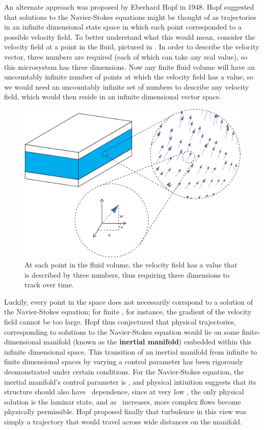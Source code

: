 An alternate approach was proposed by Eberhard Hopf in 1948. Hopf suggested that solutions to the Navier-Stokes equations might be thought of as trajectories in an infinite dimensional state space in which each point corresponded to a possible velocity field. To better understand what this would mean, consider the velocity field at a point in the fluid, pictured in . In order to describe the velocity vector, three numbers are required (each of which can take any real value), so this microsystem has three dimensions. Now any finite fluid volume will have an uncountably infinite number of points at which the velocity field has a value, so we would need an uncountably infinite set of numbers to describe any velocity field, which would then reside in an infinite dimensional vector space.
\begin{figure}
\centerline{
\includegraphics[scale=0.6]{Figs/VectorSpace}}
\caption{At each point in the fluid volume, the velocity field has a value that is described by three numbers, thus requiring three dimensions to track over time.}\label{fig:VectorSpace}
\end{figure}
Luckily, every point in the space does not necessarily corrspond to a solution of the Navier-Stokes equation; for finite \ReN, for instance, the gradient of the velocity field cannot be too large. Hopf thus conjectured that physical trajectories, corresponding to solutions to the Navier-Stokes equation would lie on some finite-dimensional manifold (known as the {\bf inertial manifold}) embedded within this infinite dimensional space. This transition of an inertial manifold from infinite to finite dimensional spaces by varying a control parameter has been rigorously deomonstrated under certain conditions. For the Navier-Stokes equation, the inertial manifold's control parameter is \ReN, and physical intiuition suggests that its structure should also have \ReN~dependence, since at very low \ReN, the only physical solution is the laminar state, and as \ReN~increases, more complex flows become physically permissible. Hopf proposed finally that turbulence in this view was simply a trajectory that would travel across wide distances on the manifold. \\

